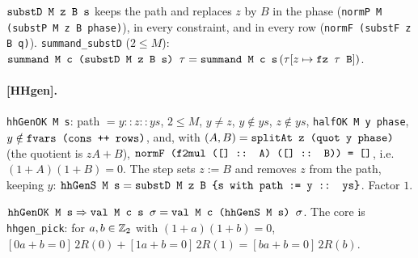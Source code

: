 \begin{definition}\label{def:lean-pathsum-substD}
$\textnormal{\texttt{substD M z B s}}$ keeps the path and replaces $z$ by $B$ in the phase
(\textnormal{\texttt{normP M (\allowbreak{}substP M z B phase)}}), in every constraint, and in every row
(\textnormal{\texttt{normF (\allowbreak{}substF z B q)}}). \textnormal{\texttt{summand\_\allowbreak{}substD}} ($2\le M$):
$\textnormal{\texttt{summand M c (\allowbreak{}substD M z B s) \ensuremath{\tau}}} = \textnormal{\texttt{summand M c s}}\,(\tau[z\mapsto\textnormal{\texttt{fz \ensuremath{\tau} B}}])$.
\end{definition}

\paragraph{[HHgen].} \textnormal{\texttt{hhGenOK M s}}: path $= y::z::ys$, $2\le M$, $y\ne z$, $y\notin ys$,
$z\notin ys$, \textnormal{\texttt{halfOK M y phase}}, $y\notin\textnormal{\texttt{fvars (\allowbreak{}cons ++ rows)}}$, and, with
$(A,B) = \textnormal{\texttt{splitAt z (\allowbreak{}quot y phase)}}$ (the quotient is $zA+B$),
$\textnormal{\texttt{normF (\allowbreak{}f2mul (\allowbreak{}[] :: A) (\allowbreak{}[] :: B)) = []}}$, i.e.\ $(1+A)(1+B)=0$. The step sets $z := B$ and
removes $z$ from the path, keeping $y$:
$\textnormal{\texttt{hhGenS M s}} = \textnormal{\texttt{substD M z B \{s with path := y :: ys\}}}$. Factor $1$.
\begin{theorem}
$\textnormal{\texttt{hhGenOK M s}}\Rightarrow\textnormal{\texttt{val M c s \ensuremath{\sigma}}} = \textnormal{\texttt{val M c (\allowbreak{}hhGenS M s) \ensuremath{\sigma}}}$. The core is
\textnormal{\texttt{hhgen\_\allowbreak{}pick}}: for $a,b\in\mathbb{Z}_{2}$ with $(1+a)(1+b)=0$,
$[0a+b=0]\,2R(0)+[1a+b=0]\,2R(1) = [ba+b=0]\,2R(b)$.
\end{theorem}

